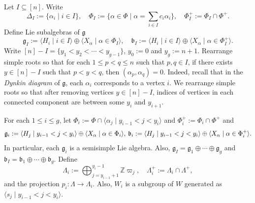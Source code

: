 \documentclass[12pt]{amsart}
\theoremstyle{definition}
\theoremstyle{remark}
\newcommand{\Z}{\mathbb{Z}}
\newcommand{\hsp}{\hspace{0.2em}}
\begin{document}
Let $I \subseteq [n]$. Write
\begin{equation}\label{eqn3.4}
\Delta_I := \{\alpha_i \mid i \in I\}, \quad \Phi_I:= \{ \alpha \in \Phi \mid \alpha = \sum_{i \in I} c_i \alpha_i\}, \quad \Phi_I^+ := \Phi_I \cap \Phi^+.
\end{equation}
Define Lie subalgebras of $\mathfrak{g}$
\begin{equation}\label{eqn3.5}
\mathfrak{g}_I := \langle H_i \mid i \in I \rangle \oplus \langle X_\alpha \mid \alpha \in \Phi_I \rangle , \quad \mathfrak{b}_I := \langle H_i \mid i \in I \rangle \oplus \langle X_\alpha \mid \alpha \in \Phi_I^+ \rangle.
\end{equation}
Write $[n]-I = \{y_1 < y_2 < \cdots < y_{g-1}\}$, $y_0 :=0$ and $y_g:=n+1$. Rearrange simple roots so that for each $1 \leq p < q \leq n$ such that $p, q \in I$, if there exists $y \in [n]-I$ such that $p < y < q $, then $(\alpha_p , \alpha_q) = 0$. Indeed, recall that in the \textit{Dynkin diagram} of $\mathfrak{g}$, each $\alpha_i$ corresponds to a vertex $i$. We rearrange simple roots so that after removing vertices $y \in [n]-I$, indices of vertices in each connected component are between some $y_i$ and $y_{i+1}$.

For each $1 \leq i \leq g$, let $\Phi_i := \Phi \cap \langle \alpha_j \mid y_{i-1} < j < y_i \rangle$ and $\Phi_i^+ := \Phi_i \cap \Phi^+$ and
\begin{equation}
\mathfrak{g}_i := \langle H_j \mid y_{i-1} < j < y_{i} \rangle \oplus \langle X_\alpha \mid \alpha \in \Phi_i \rangle, \hsp \mathfrak{b}_i := \langle H_j \mid y_{i-1} < j < y_{i} \rangle \oplus \langle X_\alpha \mid \alpha \in \Phi_i^+ \rangle.
\end{equation}
In particular, each $\mathfrak{g}_i$ is a semisimple Lie algebra. Also, $\mathfrak{g}_I = \mathfrak{g}_1 \oplus \cdots \oplus \mathfrak{g}_g$ and $\mathfrak{b}_I = \mathfrak{b}_1 \oplus \cdots \oplus \mathfrak{b}_g$. Define
\begin{equation}\label{eqn3.6}
\Lambda_i := \bigoplus_{j=y_{i-1}+1}^{y_i-1} \Z \varpi_{j}, \quad \Lambda_i^+ := \Lambda_i \cap \Lambda^+,
\end{equation}
and the projection $p_i : \Lambda \rightarrow \Lambda_i$. Also, $W_i$ is a subgroup of $W$ generated as $\langle s_{j} \mid y_{i-1} < j < y_i \rangle$.
\end{document}
